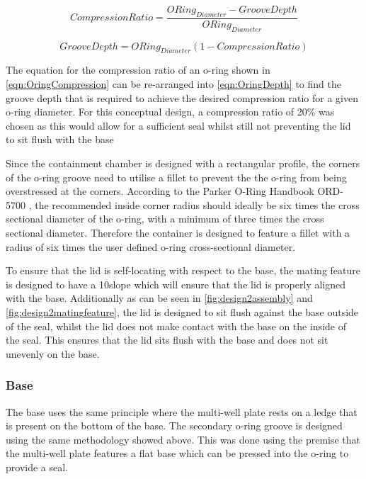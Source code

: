 \documentclass[class=report,11pt,crop=false]{standalone}
\begin{document}
\begin{equation}
	CompressionRatio = \frac{ORing_{Diameter}-GrooveDepth}{ORing_{Diameter}}
	\label{eqn:OringCompression}
\end{equation}

\begin{equation}
	GrooveDepth = ORing_{Diameter}(1-CompressionRatio)
	\label{eqn:OringDepth}
\end{equation}

The equation for the compression ratio of an o-ring shown in \autoref{eqn:OringCompression} can be re-arranged into \autoref{eqn:OringDepth} to find the groove depth that is required to achieve the desired compression ratio for a given o-ring diameter. For this conceptual design, a compression ratio of 20\% was chosen as this would allow for a sufficient seal whilst still not preventing the lid to sit flush with the base

Since the containment chamber is designed with a rectangular profile, the corners of the o-ring groove need to utilise a fillet to prevent the the o-ring from being overstressed at the corners. According to the Parker O-Ring Handbook ORD-5700 \cite{ParkerORingHandbook}, the recommended inside corner radius should ideally be six times the cross sectional diameter of the o-ring, with a minimum of three times the cross sectional diameter. Therefore the container is designed to feature a fillet with a radius of six times the user defined o-ring cross-sectional diameter.

To ensure that the lid is self-locating with respect to the base, the mating feature is designed to have a 10\degree slope which will ensure that the lid is properly aligned with the base. Additionally as can be seen in \autoref{fig:design2assembly} and \autoref{fig:design2matingfeature}, the lid is designed to sit flush against the base outside of the seal, whilst the lid does not make contact with the base on the inside of the seal. This ensures that the lid sits flush with the base and does not sit unevenly on the base. 

\subsubsection{Base}
The base uses the same principle where the multi-well plate rests on a ledge that is present on the bottom of the base. The secondary o-ring groove is designed using the same methodology showed above. This was done using the premise that the multi-well plate features a flat base which can be pressed into the o-ring to provide a seal. 
\end{document}
